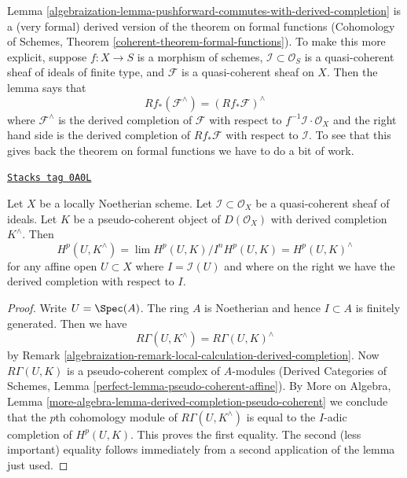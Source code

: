 \medskip\noindent
Lemma \ref{algebraization-lemma-pushforward-commutes-with-derived-completion} is a
(very formal) derived version of the theorem on formal functions
(Cohomology of Schemes, Theorem \ref{coherent-theorem-formal-functions}).
To make this more explicit, suppose $f : X \to S$ is a morphism of schemes,
$\mathcal{I} \subset \mathcal{O}_S$ is a quasi-coherent sheaf of ideals
of finite type,
and $\mathcal{F}$ is a quasi-coherent sheaf on $X$. Then the lemma says that
\begin{equation}
\label{equation-formal-functions}
Rf_*(\mathcal{F}^\wedge) = (Rf_*\mathcal{F})^\wedge
\end{equation}
where $\mathcal{F}^\wedge$ is the derived completion of $\mathcal{F}$
with respect to $f^{-1}\mathcal{I} \cdot \mathcal{O}_X$ and the right
hand side is the derived completion of $Rf_*\mathcal{F}$
with respect to $\mathcal{I}$. To see that this gives back the theorem
on formal functions we have to do a bit of work.

\begin{lemma}
\label{algebraization-lemma-sections-derived-completion-pseudo-coherent}
\href{https://stacks.math.columbia.edu/tag/0A0L}{\texttt{Stacks tag 0A0L}}

Let $X$ be a locally Noetherian scheme. Let $\mathcal{I} \subset \mathcal{O}_X$
be a quasi-coherent sheaf of ideals. Let $K$ be a
pseudo-coherent object of $D(\mathcal{O}_X)$ with derived completion
$K^\wedge$. Then
$$
H^p(U, K^\wedge) = \lim H^p(U, K)/I^nH^p(U, K) =
H^p(U, K)^\wedge
$$
for any affine open $U \subset X$
where $I = \mathcal{I}(U)$ and where on the right we have the derived
completion with respect to $I$.
\end{lemma}

\begin{proof}

Write $U = \Spec(A)$. The ring $A$ is Noetherian
and hence $I \subset A$ is finitely generated. Then we have
$$
R\Gamma(U, K^\wedge) = R\Gamma(U, K)^\wedge
$$
by Remark \ref{algebraization-remark-local-calculation-derived-completion}.
Now $R\Gamma(U, K)$ is a pseudo-coherent complex of $A$-modules
(Derived Categories of Schemes, Lemma
\ref{perfect-lemma-pseudo-coherent-affine}).
By More on Algebra, Lemma
\ref{more-algebra-lemma-derived-completion-pseudo-coherent}
we conclude that the $p$th cohomology module of $R\Gamma(U, K^\wedge)$
is equal to the $I$-adic completion of $H^p(U, K)$.
This proves the first equality. The second (less important) equality
follows immediately from a second application of the lemma just used.
\end{proof}

